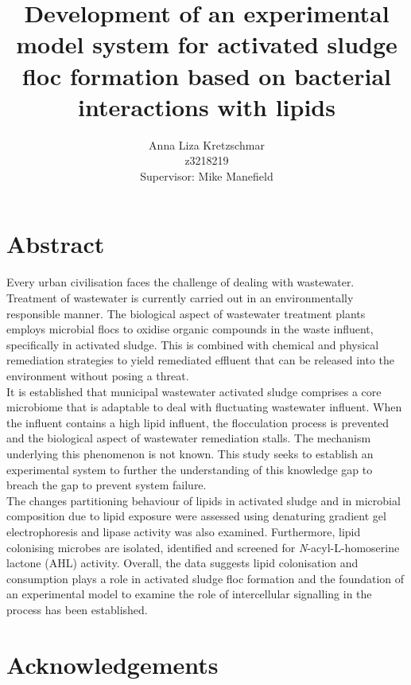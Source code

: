 \documentclass[twoside]{article}
\title{\textbf{Development of an experimental model system for activated sludge floc formation based on bacterial interactions with lipids}}
\author{Anna Liza Kretzschmar\\
        z3218219\\
        Supervisor: Mike Manefield}
\date{}
\begin{document}
\maketitle
\thispagestyle{plain}
\pagestyle{headings}
\setcounter{page}{1}


\section{Abstract}
Every urban civilisation faces the challenge of dealing with wastewater.  Treatment of wastewater is currently carried out in an environmentally responsible manner. The biological aspect of wastewater treatment plants employs microbial flocs to oxidise organic compounds in the waste influent, specifically in activated sludge. This is combined with chemical and physical remediation strategies to yield remediated effluent that can be released into the environment without posing a  threat. \\

It is established that municipal wastewater activated sludge comprises a core microbiome that is adaptable to deal with fluctuating wastewater influent. When the influent contains a high lipid influent, the flocculation process is prevented and the biological aspect of wastewater remediation stalls. The mechanism underlying this phenomenon is not known. This study seeks to establish an experimental system to further the understanding of this knowledge gap to breach the gap to prevent system failure. \\

The changes partitioning behaviour of lipids in activated sludge and in microbial composition due to lipid exposure were assessed using denaturing gradient gel electrophoresis and lipase activity was also examined. Furthermore, lipid colonising microbes are isolated, identified and screened for \emph{N}-acyl-L-homoserine lactone (AHL) activity. Overall, the data suggests lipid colonisation and consumption plays a role in activated sludge floc formation and the foundation of an experimental model to examine the role of intercellular signalling in the process has been established.
 
\newpage
\section{Acknowledgements}
\thispagestyle{plain}
\end{document}
